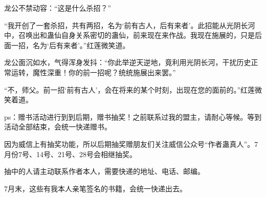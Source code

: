 \begin{this_body}
龙公不禁动容：“这是什么杀招？”

“我开创了一套杀招，共有两招，名为‘前有古人，后有来者’。此招能从光阴长河中，召唤出和蛊仙自身关系密切的蛊仙，前来现在来作战。我现在施展的，只是后面一招，名为‘后有来者’。”红莲微笑道。

龙公面沉如水，气得浑身发抖：“你此举逆天逆地，竟利用光阴长河，干扰历史正常运转，魔性深重！你的前一招呢？统统施展出来罢。”

“不，师父。前一招‘前有古人’，会在将来的某个时刻，出现在您的面前的。”红莲微笑着道。

ps：赠书活动进行到到后期，赠书抽奖！之前联系过我的盟主，请耐心等候。等到活动全部结束，会统一快递赠书。

因为威信上有抽奖功能，所以后期抽奖赠朋友们关注威信公众号“作者蛊真人”。7月份7号、14号、21号、28号会相继抽奖。

抽中的人请主动联系作者本人，需要快递的地址、电话、邮编。

7月末，这些有我本人亲笔签名的书籍，会统一快递出去。

\end{this_body}

